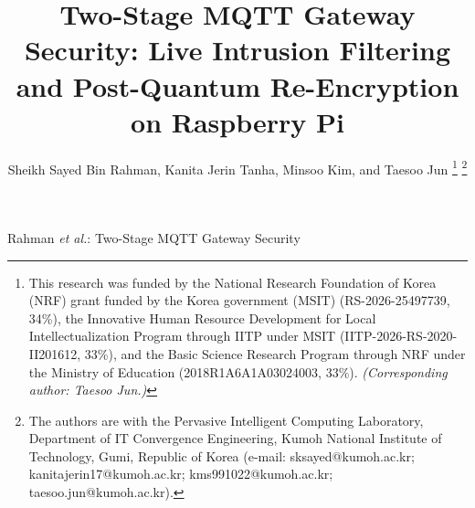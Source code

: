 \documentclass[journal]{IEEEtran}
\begin{document}
\title{Two-Stage MQTT Gateway Security: Live Intrusion Filtering and Post-Quantum Re-Encryption on Raspberry Pi}

\author{Sheikh Sayed Bin Rahman, Kanita Jerin Tanha, Minsoo Kim, and Taesoo Jun%
\thanks{This research was funded by the National Research Foundation of Korea (NRF) grant funded by the Korea government (MSIT) (RS-2026-25497739, 34\%), the Innovative Human Resource Development for Local Intellectualization Program through IITP under MSIT (IITP-2026-RS-2020-II201612, 33\%), and the Basic Science Research Program through NRF under the Ministry of Education (2018R1A6A1A03024003, 33\%). \textit{(Corresponding author: Taesoo Jun.)}}%
\thanks{The authors are with the Pervasive Intelligent Computing Laboratory, Department of IT Convergence Engineering, Kumoh National Institute of Technology, Gumi, Republic of Korea (e-mail: sksayed@kumoh.ac.kr; kanitajerin17@kumoh.ac.kr; kms991022@kumoh.ac.kr; taesoo.jun@kumoh.ac.kr).}}

%
{Rahman \MakeLowercase{\textit{et al.}}: Two-Stage MQTT Gateway Security}

\maketitle
\end{document}
